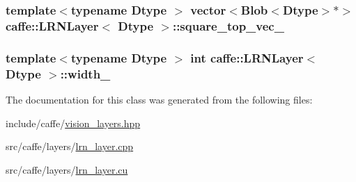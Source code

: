 \hypertarget{classcaffe_1_1_l_r_n_layer_accfb1597e6045b09dcdb421ba7e92070}{
\subsubsection[{square\+\_\+top\+\_\+vec\+\_\+}]{\setlength{\rightskip}{0pt plus 5cm}template$<$typename Dtype $>$ vector$<${\bf Blob}$<$Dtype$>$$\ast$$>$ {\bf caffe\+::\+L\+R\+N\+Layer}$<$ Dtype $>$\+::square\+\_\+top\+\_\+vec\+\_\+\hspace{0.3cm}{\ttfamily [protected]}}}\label{classcaffe_1_1_l_r_n_layer_accfb1597e6045b09dcdb421ba7e92070}
\hypertarget{classcaffe_1_1_l_r_n_layer_a5b12d5c779f16e9b1caf4c3a6d581e09}{
\subsubsection[{width\+\_\+}]{\setlength{\rightskip}{0pt plus 5cm}template$<$typename Dtype $>$ int {\bf caffe\+::\+L\+R\+N\+Layer}$<$ Dtype $>$\+::width\+\_\+\hspace{0.3cm}{\ttfamily [protected]}}}\label{classcaffe_1_1_l_r_n_layer_a5b12d5c779f16e9b1caf4c3a6d581e09}


The documentation for this class was generated from the following files\+:\begin{DoxyCompactItemize}
\item 
include/caffe/\hyperlink{vision__layers_8hpp}{vision\+\_\+layers.\+hpp}\item 
src/caffe/layers/\hyperlink{lrn__layer_8cpp}{lrn\+\_\+layer.\+cpp}\item 
src/caffe/layers/\hyperlink{lrn__layer_8cu}{lrn\+\_\+layer.\+cu}\end{DoxyCompactItemize}
